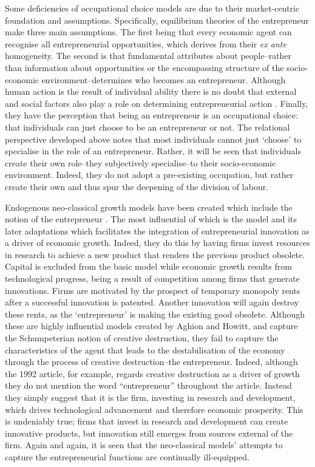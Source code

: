 Some deficiencies of occupational choice models are due to their market-centric foundation and assumptions. Specifically, equilibrium theories of the entrepreneur make three main assumptions. The first being that every economic agent can recognise all entrepreneurial opportunities, which derives from their \emph{ex ante} homogeneity. The second is that fundamental attributes about people--rather than information about opportunities or the encompassing structure of the socio-economic environment--determines who becomes an entrepreneur. Although human action is the result of individual ability there is no doubt that external and social factors also play a role on determining entrepreneurial action \citep{ShaneLockeCollins2003, AldrichMartinez2007}. Finally, they have the perception that being an entrepreneur is an occupational choice: that individuals can just choose to be an entrepreneur or not. The relational perspective developed above notes that most individuals cannot just `choose' to specialise in the role of an entrepreneur. Rather, it will be seen that individuals create their own role--they subjectively specialise--to their socio-economic environment. Indeed, they do not adopt a pre-existing occupation, but rather create their own and thus spur the deepening of the division of labour.

Endogenous neo-classical growth models have been created which include the notion of the entrepreneur \citep{Peretto1998, Sanders2007}. The most influential of which is the \citet{AghionHowitt1992} model and its later adaptations \citep{Aghion1997, HowittAghion1998} which facilitates the integration of entrepreneurial innovation as a driver of economic growth. Indeed, they do this by having firms invest resources in research to achieve a new product that renders the previous product obsolete. Capital is excluded from the basic model while economic growth results from technological progress, being a result of competition among firms that generate innovations. Firms are motivated by the prospect of temporary monopoly rents after a successful innovation is patented. Another innovation will again destroy these rents, as the `entrepreneur' is making the existing good obsolete. Although these are highly influential models created by Aghion and Howitt, and capture the Schumpeterian notion of creative destruction, they fail to capture the characteristics of the agent that leads to the destabilisation of the economy through the process of creative destruction--the entrepreneur. Indeed, although the 1992 article, for example, regards creative destruction as a driver of growth they do not mention the word ``entrepreneur'' throughout the article. Instead they simply suggest that it is the firm, investing in research and development, which drives technological advancement and therefore economic prosperity. This is undeniably true; firms that invest in research and development can create innovative products, but innovation still emerges from sources external of the firm. Again and again, it is seen that the neo-classical models' attempts to capture the entrepreneurial functions are continually ill-equipped.


